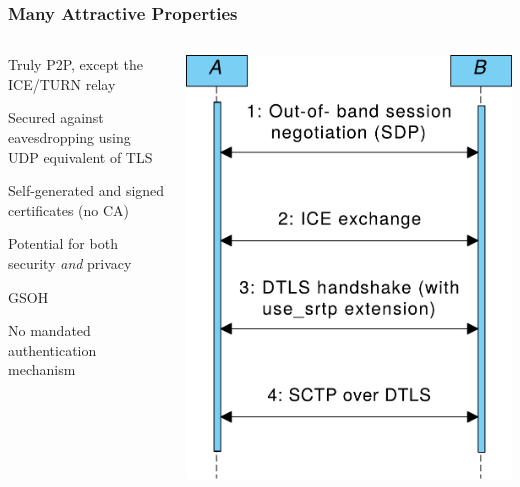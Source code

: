 \documentclass[handout, notes=hide]{beamer}
\begin{document}

\begin{frame}
\frametitle{Many Attractive Properties}

\begin{columns}[T]
\begin{column}[T]{0.6\textwidth}
\setlength{\parskip}{0.5em}

Truly P2P, except the ICE/TURN relay

Secured against eavesdropping using UDP equivalent of TLS

Self-generated and signed certificates (no CA)

Potential for both security {\it and\/} privacy

GSOH

No mandated authentication mechanism

\end{column}
\begin{column}[T]{0.4\textwidth}
\vspace{2.5em}
\includegraphics[width=1.0\textwidth]{webrtc-simplified-thinner}
\end{column}
\end{columns}
\end{frame}
\end{document}
